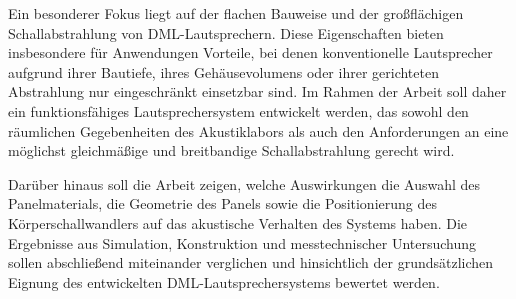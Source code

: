 Ein besonderer Fokus liegt auf der flachen Bauweise und der großflächigen Schallabstrahlung von DML-Lautsprechern. Diese Eigenschaften bieten insbesondere für Anwendungen Vorteile, bei denen konventionelle Lautsprecher aufgrund ihrer Bautiefe, ihres Gehäusevolumens oder ihrer gerichteten Abstrahlung nur eingeschränkt einsetzbar sind. Im Rahmen der Arbeit soll daher ein funktionsfähiges Lautsprechersystem entwickelt werden, das sowohl den räumlichen Gegebenheiten des Akustiklabors als auch den Anforderungen an eine möglichst gleichmäßige und breitbandige Schallabstrahlung gerecht wird.

Darüber hinaus soll die Arbeit zeigen, welche Auswirkungen die Auswahl des Panelmaterials, die Geometrie des Panels sowie die Positionierung des Körperschallwandlers auf das akustische Verhalten des Systems haben. Die Ergebnisse aus Simulation, Konstruktion und messtechnischer Untersuchung sollen abschließend miteinander verglichen und hinsichtlich der grundsätzlichen Eignung des entwickelten DML-Lautsprechersystems bewertet werden.

